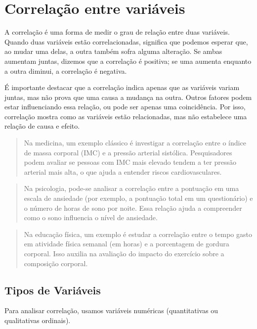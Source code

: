 \documentclass[
]{book}
\begin{document}
\chapter{Correlação entre variáveis}\label{correlauxe7uxe3o-entre-variuxe1veis}

A correlação é uma forma de medir o grau de relação entre duas variáveis. Quando duas variáveis estão correlacionadas, significa que podemos esperar que, ao mudar uma delas, a outra também sofra alguma alteração. Se ambas aumentam juntas, dizemos que a correlação é positiva; se uma aumenta enquanto a outra diminui, a correlação é negativa.

É importante destacar que a correlação indica apenas que as variáveis variam juntas, mas não prova que uma causa a mudança na outra. Outros fatores podem estar influenciando essa relação, ou pode ser apenas uma coincidência. Por isso, correlação mostra como as variáveis estão relacionadas, mas não estabelece uma relação de causa e efeito.

\begin{quote}
Na medicina, um exemplo clássico é investigar a correlação entre o índice de massa corporal (IMC) e a pressão arterial sistólica. Pesquisadores podem avaliar se pessoas com IMC mais elevado tendem a ter pressão arterial mais alta, o que ajuda a entender riscos cardiovasculares.
\end{quote}

\begin{quote}
Na psicologia, pode-se analisar a correlação entre a pontuação em uma escala de ansiedade (por exemplo, a pontuação total em um questionário) e o número de horas de sono por noite. Essa relação ajuda a compreender como o sono influencia o nível de ansiedade.
\end{quote}

\begin{quote}
Na educação física, um exemplo é estudar a correlação entre o tempo gasto em atividade física semanal (em horas) e a porcentagem de gordura corporal. Isso auxilia na avaliação do impacto do exercício sobre a composição corporal.
\end{quote}

\section{Tipos de Variáveis}\label{tipos-de-variuxe1veis-1}

Para analisar correlação, usamos variáveis numéricas (quantitativas ou qualitativas ordinais).
\end{document}
